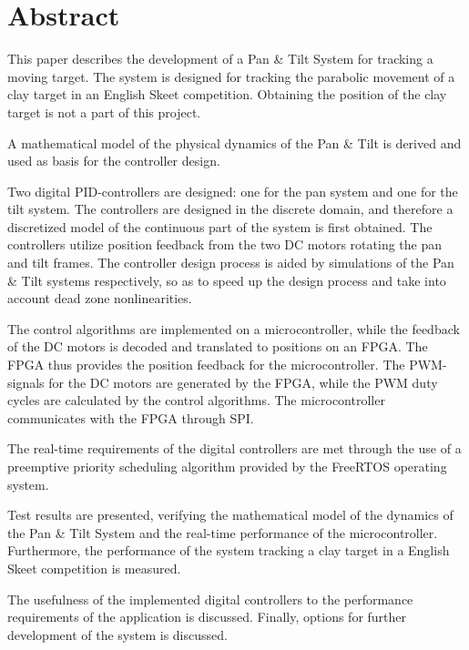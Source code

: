 
\setcounter{page}{1}
\section*{Abstract}
This paper describes the development of a Pan \& Tilt System for tracking a moving
target. The system is designed for tracking the parabolic movement of
a clay target in an English Skeet competition.
Obtaining the position of the clay target is not a part of this project. 

A mathematical model of the physical dynamics of the Pan \& Tilt is
derived and used as basis for the controller design.

Two digital PID-controllers are designed: one for the pan system and one for the tilt system.
The controllers are designed in the discrete domain, and therefore a discretized model
of the continuous part of the system is first obtained.
The controllers utilize position feedback from 
the two DC motors
rotating the pan and tilt frames.
The controller design process is aided by simulations of the Pan \& Tilt systems respectively,
so as to speed up the design process and take into account dead zone nonlinearities.

The control algorithms are implemented on a microcontroller, while
the feedback of the DC motors is decoded and translated to positions on an FPGA.
The FPGA thus provides the position feedback for the microcontroller.
The PWM-signals for the DC motors are generated by the FPGA, while the PWM duty cycles are calculated by the control algorithms.
The microcontroller communicates with the FPGA through SPI.

The real-time requirements of the digital controllers are met through the use
of a preemptive priority scheduling algorithm provided by the FreeRTOS operating
system.

Test results are presented,
verifying the mathematical model of the dynamics of the Pan \& Tilt System
and the real-time performance of the microcontroller.
Furthermore, the performance of the system tracking a clay target in a English Skeet competition is measured.

The usefulness of the implemented digital controllers to the performance requirements
of the application is discussed. Finally, options for further development of the system is discussed. 

